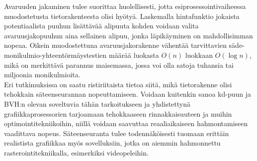 \documentclass[a4paper, 12pt, titlepage]{article}
\begin{document}
Avaruuden jakaminen tulee suorittaa huolellisesti, jotta esiprosessointivaiheessa muodostetusta tietorakenteesta olisi hyötyä. Laskemalla hintafunktio jokaista potentiaalista puuhun lisättävää alipuuta kohden voidaan valita avaruusjakopuuhun aina sellainen alipuu, jonka läpikäyminen on mahdollisimman nopeaa. Oikein muodostettuna avaruusjakorakenne vähentää tarvittavien säde-monikulmio-yhteentörmäystestien määrää luokasta $O(n)$ luokkaan $O(\log n)$, mikä on merkittävä parannus maisemassa, jossa voi olla satoja tuhansia tai miljoonia monikulmioita. \\

Eri tutkimuksissa on saatu ristiriitaista tietoa siitä, mikä tietorakenne olisi tehokkain säteenseurannan nopeuttamiseen. Voidaan kuitenkin sanoa kd-puun ja BVH:n olevan soveltuvia tähän tarkoitukseen ja yhdistettynä grafiikkaprosessorien tarjoamaan tehokkaaseen rinnakkaisuuteen ja muihin optimointitekniikoihin, niillä voidaan saavuttaa reaaliaikaiseen hahmontamiseen vaadittava nopeus. Säteenseuranta tulee todennäköisesti tuomaan erittäin realistista grafiikkaa myös sovelluksiin, jotka on aiemmin hahmonnettu rasterointitekniikalla, esimerkiksi videopeleihin. \\



\clearpage

\clearpage
\listofalgorithms
\end{document}
